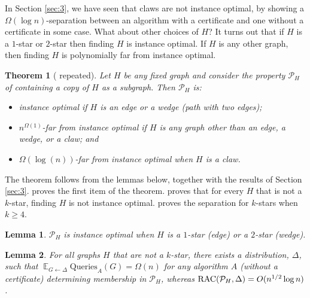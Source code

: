 \documentclass[11pt]{article}
\numberwithin{equation}{section}
\newtheorem{theorem}{Theorem}[section]
\newtheorem{lemma}[lemma]{Lemma}
\newcommand\E{\mathop{\mathbb E}}
\newcommand{\Query}{\text{Queries}}
\renewcommand{\P}{\mathcal{P}}
\newcommand{\kstar}[1]{\ensuremath{#1}-star}
\newcommand{\1}{\mathbf{1}}
\begin{document}
 In Section \ref{sec:3}, we have seen that claws are not instance optimal, by showing a $\Omega(\log n)$-separation between an algorithm with a certificate and one without a certificate in some case. What about other choices of $H$? It turns out that if $H$ is a \kstar{1} or \kstar{2} then finding $H$ is instance optimal. If $H$ is any other graph, then finding $H$ is polynomially far from instance optimal. 







\begin{theorem}[ repeated]
Let $H$ be any fixed graph and consider the property $\mathcal{P}_H$ of containing a copy of $H$ as a subgraph. Then $\mathcal{P}_H$ is:
\begin{itemize}
\item instance optimal if $H$ is an edge or a wedge (path with two edges);
\item $n^{\Omega(1)}$-far from instance optimal if $H$ is any graph other than an edge, a wedge, or a claw; and
\item $\Omega(\log(n))$-far from instance optimal when $H$ is a claw.
  \end{itemize}
\end{theorem}



The theorem follows from the lemmas below, together with the results of Section \ref{sec:3}.  proves the first item of the theorem. 
 proves that for every $H$ that is not a \kstar{k}, finding $H$ is not instance optimal.  proves the separation for $k$-stars when $k \geq 4$. 



 \begin{lemma} \label{lemma:deg1}
$\mathcal{P}_H$ is instance optimal when $H$ is a \kstar{1} (edge) or a \kstar{2} (wedge).
 \end{lemma}
 


 \begin{lemma} \label{lemma:star}
 For all graphs $H$ that are not a \kstar{k}, there exists a distribution, $\Delta$, such that $\E_{G \leftarrow \Delta} \Query_A(G) = \Omega(n)$ for any algorithm $A$ (without a certificate) determining membership in $\P_H$, whereas $\RACC(\P_H,\Delta) = O(n^{1/2} \log n)$. 
 \end{lemma}
 
\end{document}
